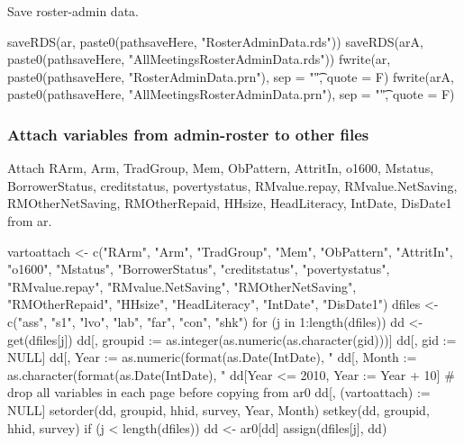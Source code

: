 
Save roster-admin data.
\begin{Schunk}
\begin{Sinput}
saveRDS(ar, paste0(pathsaveHere, "RosterAdminData.rds"))
saveRDS(arA, paste0(pathsaveHere, "AllMeetingsRosterAdminData.rds"))
fwrite(ar, paste0(pathsaveHere, "RosterAdminData.prn"), sep = "\t", quote = F)
fwrite(arA, paste0(pathsaveHere, "AllMeetingsRosterAdminData.prn"), sep = "\t", quote = F)
\end{Sinput}
\end{Schunk}












\subsubsection{Attach variables from admin-roster to other files}


Attach \textsf{RArm, Arm, TradGroup, Mem, ObPattern, AttritIn, o1600, Mstatus, BorrowerStatus, creditstatus, povertystatus, RMvalue.repay, RMvalue.NetSaving, RMOtherNetSaving, RMOtherRepaid, HHsize, HeadLiteracy, IntDate, DisDate1} from \textsf{ar}.

\begin{Schunk}
\begin{Sinput}
vartoattach <- c("RArm", "Arm", "TradGroup", "Mem", 
  "ObPattern", "AttritIn", "o1600", "Mstatus", "BorrowerStatus", 
  "creditstatus", "povertystatus", "RMvalue.repay", 
  "RMvalue.NetSaving", "RMOtherNetSaving", "RMOtherRepaid",
  "HHsize", "HeadLiteracy", "IntDate", "DisDate1")
dfiles <- c("ass", "s1", "lvo", "lab", "far", "con", "shk")
for (j in 1:length(dfiles)) {
  dd <- get(dfiles[j])
  dd[, groupid := as.integer(as.numeric(as.character(gid)))]
  dd[, gid := NULL]
  dd[, Year :=  as.numeric(format(as.Date(IntDate), "%Y"))]
  dd[, Month := as.character(format(as.Date(IntDate), "%B"))]
  dd[Year <= 2010, Year := Year + 10]
  # drop all variables in each page before copying from ar0
  dd[, (vartoattach) := NULL]
  setorder(dd, groupid, hhid, survey, Year, Month)
  setkey(dd, groupid, hhid, survey)
  if (j < length(dfiles)) dd <- ar0[dd]
  assign(dfiles[j], dd)
}
\end{Sinput}
\end{Schunk}

